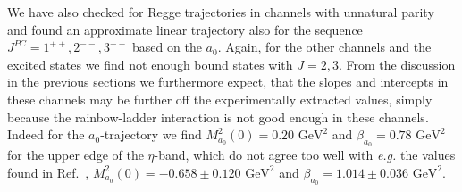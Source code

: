 We have also checked for Regge trajectories in channels with unnatural parity and found an 
approximate linear trajectory also for the sequence $J^{PC}=1^{++}, 2^{--}, 3^{++}$ based 
on the $a_0$. Again, for the other channels and the excited states we find not enough bound 
states with $J=2,3$. From the discussion in the previous sections we furthermore expect, 
that the slopes and intercepts in these channels may be further off the experimentally extracted 
values, simply because the rainbow-ladder interaction is not good enough in these channels. 
Indeed for the $a_0$-trajectory we find $M^2_{a_0}(0) = 0.20\,\, \mbox{GeV}^2$ and
$\beta_{a_0} = 0.78 \,\,\mbox{GeV}^2$ for the upper edge of the $\eta$-band, which do not 
agree too well with {\it e.g.} the values found in Ref.~\cite{Ebert:2009ub}, 
$M^2_{a_0}(0) = -0.658 \pm 0.120\,\, \mbox{GeV}^2$ and
$\beta_{a_0} = 1.014 \pm 0.036 \,\,\mbox{GeV}^2$.







